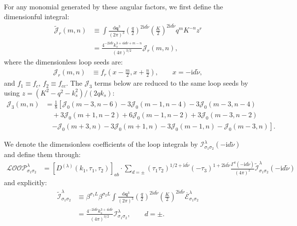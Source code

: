 \documentclass[a4paper,12pt]{article}
\def\di{{\mathrm{d}}}
\def\mb{\mathbf}
\def\ii{\mathrm{i}}
\def\be{\beta}
\def\lam{\lambda}
\def\si{\sigma}
\def\tn{\tilde\nu}
\begin{document}
For any monomial generated by these angular factors, we first define the dimensionful integral:
\begin{align}
    \widetilde{\mathcal{J}}_r(m,n)
    &\equiv
    \int \frac{\di\mb q^3}{(2\pi)^3}
    \left(\frac{q}{2}\right)^{2\ii d\tn}
    \left(\frac{K}{2}\right)^{2\ii d\tn}
    q^m K^{-n} z^r \nonumber \\
    &=\frac{4^{-2\ii d\tn}k_s^{3+4\ii d\tn+m-n}}{(4\pi)^{3/2}}
    \mathcal{J}_r(m,n),
\end{align}
where the dimensionless loop seeds are:
\begin{align}
    \mathcal{J}_r(m,n)
    &\equiv f_r\left(x-\frac{m}{2},x+\frac{n}{2}\right),
    \qquad x=-\ii d\tn ,
\end{align}
and $f_1\equiv f_c$, $f_2\equiv f_{cc}$. The $\mathcal{J}_3$ terms below are reduced to the same loop seeds by using
$z=(K^2-q^2-k_s^2)/(2qk_s)$:
\begin{align}
    \mathcal{J}_3(m,n)
    &= \frac{1}{8}
    \left[\mathcal{J}_0(m-3,n-6)-3\mathcal{J}_0(m-1,n-4)
    -3\mathcal{J}_0(m-3,n-4)\right. \nonumber \\
    &\quad
    +3\mathcal{J}_0(m+1,n-2)+6\mathcal{J}_0(m-1,n-2)
    +3\mathcal{J}_0(m-3,n-2) \nonumber \\
    &\quad\left.
    -\mathcal{J}_0(m+3,n)-3\mathcal{J}_0(m+1,n)
    -3\mathcal{J}_0(m-1,n)-\mathcal{J}_0(m-3,n)\right].
\end{align}

We denote the dimensionless coefficients of the loop integrals by $\mathcal{I}_{\si_1\si_2}^{\lam}(-\ii d\tn)$ and define them through:
\begin{align}
    \mathcal{LOOP}_{\sigma_1\sigma_2}^{\lambda} 
    &= \left[D^{(\lambda)}(k_1,\tau_1,\tau_2)\right]_{ab}
    \cdot \sum_{d=\pm}
    (\tau_1\tau_2)^{1/2+\ii d\tn}(-\tau_3)^{1+2\ii d\tn} 
    \frac{\Gamma^4(-\ii d\tn)}{(4\pi)^{2}}
    \tilde{\mathcal{I}}^{\lam}_{\si_1 \si_2}(-\ii d\tn)
\end{align}
and explicitly:
\begin{align}
    \widetilde{\mathcal{I}}^{\lambda}_{\sigma_1\sigma_2}
    &\equiv \be^{\si_1L} \be^{\si_2L} \int\frac{\di\mb q^3}{(2\pi)^3}
    \left(\frac{q}{2}\right)^{2\ii d\tn}
    \left(\frac{K}{2}\right)^{2\ii d\tn}
    \overline{\mathcal{E}}^{\lambda}_{\sigma_1\sigma_2} \nonumber \\
    &=\frac{4^{-2\ii d\tn}k_s^{3+4\ii d\tn}}{(4\pi)^{3/2}}
    \mathcal{I}^{\lambda}_{\sigma_1\sigma_2},
    \qquad d=\pm.
\end{align}
\end{document}
